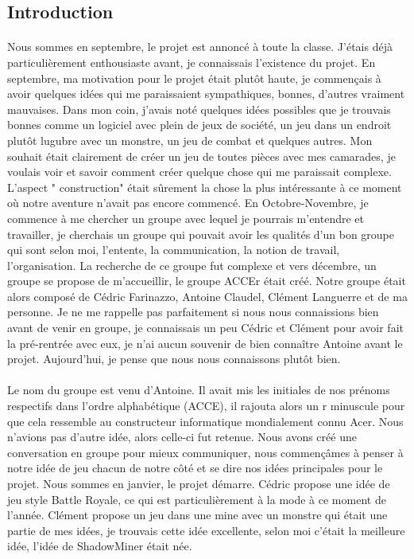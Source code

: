\documentclass[titlepage, 13px, a4paper]{report}
\begin{document}
\subsection{Introduction}

\paragraph*{} \hspace{0pt}
Nous sommes en septembre, le projet est annoncé à toute la classe. 
J’étais déjà particulièrement enthousiaste avant, je connaissais l’existence du projet. 
En septembre, ma motivation pour le projet était plutôt haute, je commençais à avoir quelques idées 
qui me paraissaient sympathiques, bonnes, d’autres vraiment mauvaises. Dans mon coin, 
j’avais noté quelques idées possibles que je trouvais bonnes comme un logiciel avec plein de jeux de société, 
un jeu dans un endroit plutôt lugubre avec un monstre, un jeu de combat et quelques autres. 
Mon souhait était clairement de créer un jeu de toutes pièces avec mes camarades, 
je voulais voir et savoir comment créer quelque chose qui me paraissait complexe. 
L’aspect " construction"  était sûrement la chose la plus intéressante à ce moment où notre aventure 
n’avait pas encore commencé. En Octobre-Novembre, je commence à me chercher un groupe avec lequel je pourrais 
m’entendre et travailler, je cherchais un groupe qui pouvait avoir les qualités d’un bon groupe 
qui sont selon moi, l’entente, la communication, la notion de travail, l’organisation. 
La recherche de ce groupe fut complexe et vers décembre, un groupe se propose de m’accueillir, 
le groupe ACCEr était créé. Notre groupe était alors composé de Cédric Farinazzo, Antoine Claudel, 
Clément Languerre et de ma personne. Je ne me rappelle pas parfaitement si nous nous connaissions 
bien avant de venir en groupe, je connaissais un peu Cédric et Clément pour avoir fait 
la pré-rentrée avec eux, je n’ai aucun souvenir de bien connaître Antoine avant le projet. 
Aujourd’hui, je pense que nous nous connaissons plutôt bien. \\


\paragraph*{} \hspace{0pt}
Le nom du groupe est venu d'Antoine. Il avait mis les initiales de nos 
prénoms respectifs dans l’ordre alphabétique (ACCE), il rajouta alors un r minuscule pour 
que cela ressemble au constructeur informatique mondialement connu Acer. Nous n’avions pas 
d’autre idée, alors celle-ci fut retenue. Nous avons créé une conversation en groupe pour 
mieux communiquer, nous commençâmes à penser à notre idée de jeu chacun de notre côté et 
se dire nos idées principales pour le projet. Nous sommes en janvier, le projet démarre. 
Cédric propose une idée de jeu style Battle Royale, ce qui est particulièrement à la mode 
à ce moment de l’année. Clément propose un jeu dans une mine avec un monstre qui était une 
partie de mes idées, je trouvais cette idée excellente, selon moi c’était la meilleure idée, 
l’idée de ShadowMiner était née. \\
\end{document}
